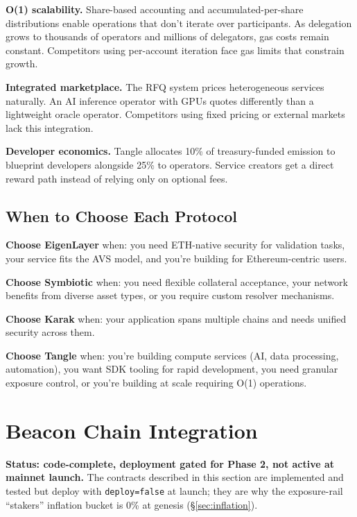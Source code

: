 \documentclass[11pt,a4paper]{article}
\begin{document}
\textbf{O(1) scalability.} Share-based accounting and accumulated-per-share distributions enable operations that don't iterate over participants. As delegation grows to thousands of operators and millions of delegators, gas costs remain constant. Competitors using per-account iteration face gas limits that constrain growth.

\textbf{Integrated marketplace.} The RFQ system prices heterogeneous services naturally. An AI inference operator with GPUs quotes differently than a lightweight oracle operator. Competitors using fixed pricing or external markets lack this integration.

\textbf{Developer economics.} Tangle allocates 10\% of treasury-funded emission to blueprint developers alongside 25\% to operators. Service creators get a direct reward path instead of relying only on optional fees.

\subsection{When to Choose Each Protocol}

\textbf{Choose EigenLayer} when: you need ETH-native security for validation tasks, your service fits the AVS model, and you're building for Ethereum-centric users.

\textbf{Choose Symbiotic} when: you need flexible collateral acceptance, your network benefits from diverse asset types, or you require custom resolver mechanisms.

\textbf{Choose Karak} when: your application spans multiple chains and needs unified security across them.

\textbf{Choose Tangle} when: you're building compute services (AI, data processing, automation), you want SDK tooling for rapid development, you need granular exposure control, or you're building at scale requiring O(1) operations.

\section{Beacon Chain Integration}
\label{sec:beacon}

\textbf{Status: code-complete, deployment gated for Phase 2, not active at mainnet launch.} The contracts described in this section are implemented and tested but deploy with \texttt{deploy=false} at launch; they are why the exposure-rail ``stakers'' inflation bucket is 0\% at genesis (\S\ref{sec:inflation}).
\end{document}
